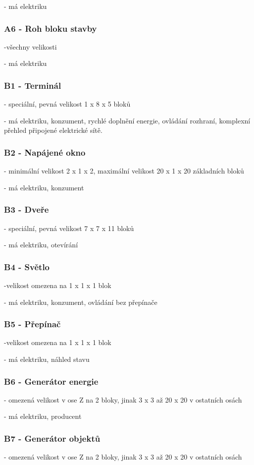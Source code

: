 - má elektriku
\subsubsection{A6 - Roh bloku stavby}
-všechny velikosti

- má elektriku

\subsubsection{B1 - Terminál}
- speciální, pevná velikost 1 x 8 x 5 bloků

- má elektriku, konzument, rychlé doplnění energie, ovládání rozhraní, komplexní přehled připojené elektrické sítě.
\subsubsection{B2 - Napájené okno}
- minimální velikost 2 x 1 x 2, maximální velikost 20 x 1 x 20 základních bloků

- má elektriku, konzument
\subsubsection{B3 - Dveře}
- speciální, pevná velikost 7 x 7 x 11 bloků

- má elektriku, otevírání
\subsubsection{B4 - Světlo}
-velikost omezena na 1 x 1 x 1 blok

- má elektriku, konzument, ovládání bez přepínače
\subsubsection{B5 - Přepínač}
-velikost omezena na 1 x 1 x 1 blok

- má elektriku, náhled stavu
\subsubsection{B6 - Generátor energie}
- omezená velikost v ose Z na 2 bloky, jinak 3 x 3 až 20 x 20 v ostatních osách

- má elektriku, producent
\subsubsection{B7 - Generátor objektů}
- omezená velikost v ose Z na 2 bloky, jinak 3 x 3 až 20 x 20 v ostatních osách

